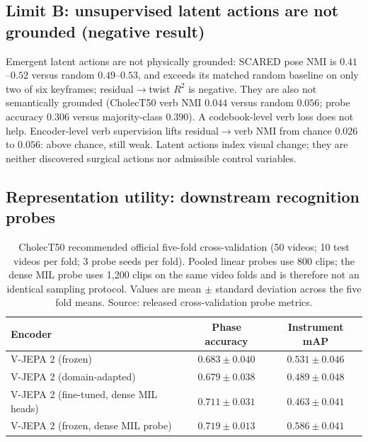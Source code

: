 \documentclass[preprint,12pt]{elsarticle}
\begin{document}
\subsection{Limit B: unsupervised latent actions are not grounded (negative result)}
\label{sec:rq5}
Emergent latent actions are not physically grounded: SCARED pose NMI is
$0.41$--$0.52$ versus random $0.49$--$0.53$, and exceeds its matched random
baseline on only two of six keyframes; residual$\to$twist $R^2$ is negative.
They are also not semantically grounded (CholecT50 verb NMI $0.044$ versus
random $0.056$; probe accuracy $0.306$ versus majority-class $0.390$).
A codebook-level verb loss does not help.
Encoder-level verb supervision lifts residual$\to$verb NMI from chance $0.026$ to $0.056$: above chance, still weak.
Latent actions index visual change; they are neither discovered surgical
actions nor admissible control variables.

\subsection{Representation utility: downstream recognition probes}
\label{sec:rq6}

\begin{table}[t]
\centering
\caption{CholecT50 recommended official five-fold cross-validation
(50 videos; 10 test videos per fold; 3 probe seeds per fold).
Pooled linear probes use 800 clips; the dense MIL probe uses 1{,}200 clips on
the same video folds and is therefore not an identical sampling protocol.
Values are mean $\pm$ standard deviation across the five fold means.
Source: released cross-validation probe metrics.}
\label{tab:downstream-cv}
\small
\begin{tabular}{lcc}
\toprule
Encoder & Phase accuracy & Instrument mAP \\
\midrule
V-JEPA 2 (frozen) & $0.683\pm0.040$ & $0.531\pm0.046$ \\
V-JEPA 2 (domain-adapted) & $0.679\pm0.038$ & $0.489\pm0.048$ \\
V-JEPA 2 (fine-tuned, dense MIL heads) & $0.711\pm0.031$ & $0.463\pm0.041$ \\
V-JEPA 2 (frozen, dense MIL probe) & $\mathbf{0.719\pm0.013}$ & $\mathbf{0.586\pm0.041}$ \\
\bottomrule
\end{tabular}
\end{table}
\end{document}
